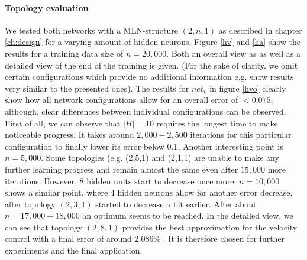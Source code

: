 \documentclass[10pt,a4paper,DIV=11]{scrreprt}
\begin{document}
\paragraph{Topology evaluation} We tested both networks with a MLN-structure $(2,n,1)$ as described in chapter \ref{ch:design} for a varying amount of hidden neurons.
Figure \ref{hv} and \ref{ha} show the results for a training data size of $n = 20,000$. Both an overall view as as well as a detailed view of the end of the training is given.
(For the sake of clarity, we omit certain configurations which provide no additional information e.g. show results very similar to the presented ones).
The results for $net_v$ in figure \ref{hvo} clearly show how all network configurations allow for an overall error of $<0.075$, although, clear differences between individual 
configurations can be observed. First of all, we can observe that $|H| = 10$ requires the longest time to make noticeable progress. It takes around $2,000-2,500$ iterations for this 
particular configuration to finally lower its error below $0.1$. Another interesting point is $n=5,000$. Some topologies (e.g. (2,5,1) and (2,1,1) are unable to make any 
further learning progress and remain almost the same even after $15,000$ more iterations. However, 8 hidden units start to decrease once more. $n=10,000$ shows a similar point, where
4 hidden neurons allow for another error decrease, after topology $(2,3,1)$ started to decrease a bit earlier. After about $n=17,000-18,000$ an optimum seems to be reached. 
In the detailed view, we can see that topology $(2,8,1)$ provides the best approximation for the velocity control with a final error of around $2.086\%$ . 
It is therefore chosen for further experiments and the final application.
\end{document}
